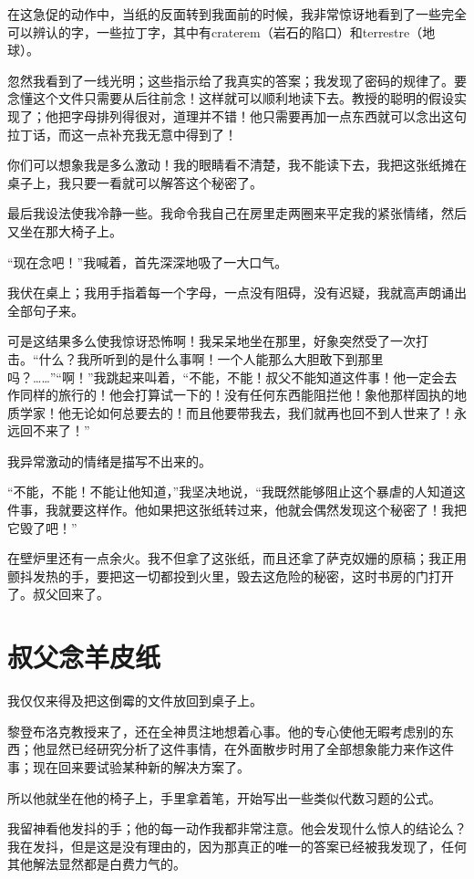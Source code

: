 \documentclass[10pt]{book}
\begin{document}
在这急促的动作中，当纸的反面转到我面前的时候，我非常惊讶地看到了一些完全可以辨认的字，一些拉丁字，其中有craterem（岩石的陷口）和terrestre（地球）。

忽然我看到了一线光明；这些指示给了我真实的答案；我发现了密码的规律了。要念懂这个文件只需要从后往前念！这样就可以顺利地读下去。教授的聪明的假设实现了；他把字母排列得很对，道理并不错！他只需要再加一点东西就可以念出这句拉丁话，而这一点补充我无意中得到了！

你们可以想象我是多么激动！我的眼睛看不清楚，我不能读下去，我把这张纸摊在桌子上，我只要一看就可以解答这个秘密了。

最后我设法使我冷静一些。我命令我自己在房里走两圈来平定我的紧张情绪，然后又坐在那大椅子上。

“现在念吧！”我喊着，首先深深地吸了一大口气。

我伏在桌上；我用手指着每一个字母，一点没有阻碍，没有迟疑，我就高声朗诵出全部句子来。

可是这结果多么使我惊讶恐怖啊！我呆呆地坐在那里，好象突然受了一次打击。“什么？我所听到的是什么事啊！一个人能那么大胆敢下到那里吗？……”“啊！”我跳起来叫着，“不能，不能！叔父不能知道这件事！他一定会去作同样的旅行的！他会打算试一下的！没有任何东西能阻拦他！象他那样固执的地质学家！他无论如何总要去的！而且他要带我去，我们就再也回不到人世来了！永远回不来了！”

我异常激动的情绪是描写不出来的。

“不能，不能！不能让他知道，”我坚决地说，“我既然能够阻止这个暴虐的人知道这件事，我就要这样作。他如果把这张纸转过来，他就会偶然发现这个秘密了！我把它毁了吧！”

在壁炉里还有一点余火。我不但拿了这张纸，而且还拿了萨克奴姗的原稿；我正用颤抖发热的手，要把这一切都投到火里，毁去这危险的秘密，这时书房的门打开了。叔父回来了。

\chapter{叔父念羊皮纸}
我仅仅来得及把这倒霉的文件放回到桌子上。

黎登布洛克教授来了，还在全神贯注地想着心事。他的专心使他无暇考虑别的东西；他显然已经研究分析了这件事情，在外面散步时用了全部想象能力来作这件事；现在回来要试验某种新的解决方案了。

所以他就坐在他的椅子上，手里拿着笔，开始写出一些类似代数习题的公式。

我留神看他发抖的手；他的每一动作我都非常注意。他会发现什么惊人的结论么？我在发抖，但是这是没有理由的，因为那真正的唯一的答案已经被我发现了，任何其他解法显然都是白费力气的。
\end{document}

